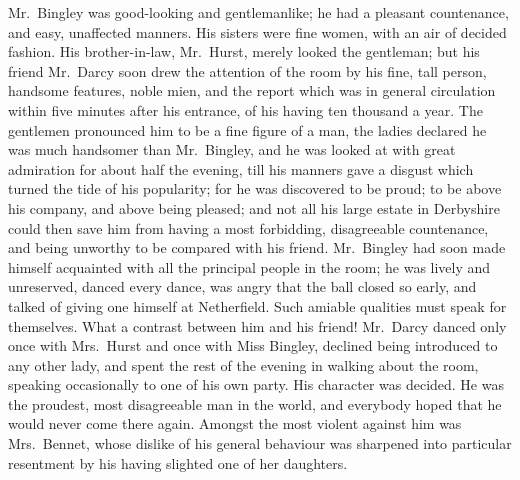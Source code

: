 Mr.~Bingley was good-looking and gentlemanlike;
he had a pleasant countenance, and easy, unaffected manners.
His sisters were fine women, with an air of decided fashion.
His brother-in-law, Mr.~Hurst, merely looked the gentleman;
but his friend Mr.~Darcy soon drew the attention of the room by his
fine, tall person, handsome features, noble mien,
and the report which was in general circulation within five minutes after his entrance,
of his having ten thousand a year.
The gentlemen pronounced him to be a fine figure of a man,
the ladies declared he was much handsomer than Mr.~Bingley,
and he was looked at with great admiration for about half the evening,
till his manners gave a disgust which turned the tide of his popularity;
for he was discovered to be proud;
to be above his company, and above being pleased;
and not all his large estate in Derbyshire could then save him from having a most forbidding,
disagreeable countenance, and being unworthy to be compared with his friend.
Mr.~Bingley had soon made himself acquainted with all the principal people in the room;
he was lively and unreserved, danced every dance, was angry that the ball closed so early,
and talked of giving one himself at Netherfield.
Such amiable qualities must speak for themselves.
What a contrast between him and his friend!
Mr.~Darcy danced only once with Mrs.~Hurst and once with Miss Bingley,
declined being introduced to any other lady,
and spent the rest of the evening in walking about the room,
speaking occasionally to one of his own party.
His character was decided.
He was the proudest, most disagreeable man in the world,
and everybody hoped that he would never come there again.
Amongst the most violent against him was Mrs.~Bennet,
whose dislike of his general behaviour was sharpened into particular resentment
by his having slighted one of her daughters.